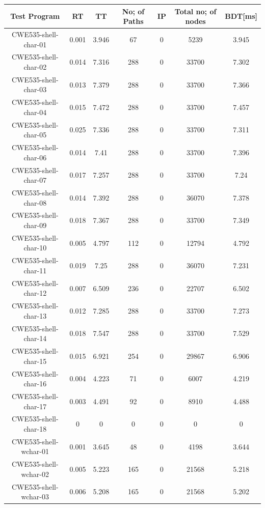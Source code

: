\begin{table}[h!]
\centering
 \begin{tabular}{||c |c |c |c |c| c|c||} 
 \hline
 \textbf{Test Program} & \textbf{RT} & \textbf{TT} & \textbf{No; of Paths} & \textbf{IP}& \textbf{Total no; of nodes}&\textbf{BDT[ms]}\\ [0.5ex] 
 \hline\hline
 CWE535-shell-char-01 & 0.001 & 3.946 &67 & 0&5239& 3.945\\ 
 \hline
CWE535-shell-char-02 & 0.014 & 7.316 & 288&0& 33700& 7.302 \\
 \hline
 CWE535-shell-char-03 & 0.013 & 7.379 & 288&0& 33700&7.366 \\ 
 \hline
 CWE535-shell-char-04 & 0.015 & 7.472 & 288&0& 33700&7.457 \\ 
 \hline
 CWE535-shell-char-05 & 0.025 & 7.336 & 288&0& 33700& 7.311\\ 
 \hline
 CWE535-shell-char-06 & 0.014 & 7.41 & 288&0& 33700&7.396 \\ 
 \hline
 CWE535-shell-char-07 & 0.017 & 7.257 & 288&0& 33700&7.24 \\ 
 \hline
 CWE535-shell-char-08 & 0.014 & 7.392 & 288&0& 36070&7.378 \\ 
 \hline
 CWE535-shell-char-09 & 0.018 & 7.367 & 288&0& 33700&7.349 \\ 
 \hline
 CWE535-shell-char-10 & 0.005 & 4.797 & 112&0&12794 &4.792 \\ 
 \hline
 CWE535-shell-char-11 & 0.019 & 7.25 & 288&0&36070& 7.231 \\ 
 \hline
 CWE535-shell-char-12 &0.007  & 6.509 &236&0& 22707& 6.502\\ 
 \hline
 CWE535-shell-char-13 &0.012  & 7.285 & 288&0& 33700&7.273 \\ 
 \hline
 CWE535-shell-char-14 & 0.018 & 7.547 & 288&0& 33700& 7.529\\ 
 \hline
 CWE535-shell-char-15 & 0.015 & 6.921 &254&0&29867&6.906 \\ 
 \hline
  CWE535-shell-char-16 & 0.004 & 4.223 & 71&0& 6007& 4.219\\ 
 \hline
  CWE535-shell-char-17 & 0.003 &4.491 & 92&0& 8910&4.488 \\ 
 \hline
  CWE535-shell-char-18 & 0 & 0 & 0&0& 0&0 \\ 
  \hline
  CWE535-shell-wchar-01 & 0.001 & 3.645 &48 & 0& 4198&3.644 \\ 
 \hline
CWE535-shell-wchar-02 & 0.005 & 5.223 & 165&0& 21568&5.218 \\ 
 \hline
 CWE535-shell-wchar-03 & 0.006 & 5.208 & 165&0& 21568& 5.202\\ 

\end{tabular}
\end{table}
